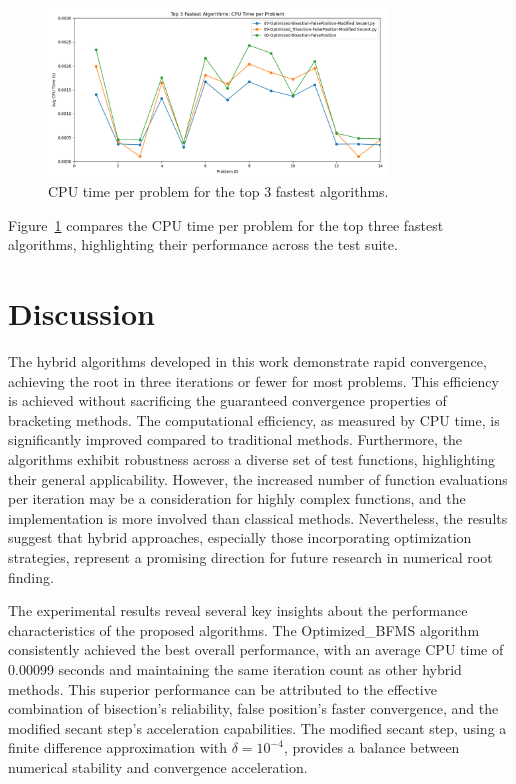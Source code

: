 \documentclass[amsmath, amssymb, aps]{revtex4-2}
\begin{document}
\begin{figure}[H]
    \centering
    \includegraphics[width=0.8\textwidth]{top3_fastest_algorithms_lineplot.png}
    \caption{CPU time per problem for the top 3 fastest algorithms.}
    \label{fig:top3_fastest_algorithms}
\end{figure}

Figure~\ref{fig:top3_fastest_algorithms} compares the CPU time per problem for the top three fastest algorithms, highlighting their performance across the test suite.

\section{Discussion}\label{sec:discussion}

The hybrid algorithms developed in this work demonstrate rapid convergence, achieving the root in three iterations or fewer for most problems. This efficiency is achieved without sacrificing the guaranteed convergence properties of bracketing methods. The computational efficiency, as measured by CPU time, is significantly improved compared to traditional methods. Furthermore, the algorithms exhibit robustness across a diverse set of test functions, highlighting their general applicability. However, the increased number of function evaluations per iteration may be a consideration for highly complex functions, and the implementation is more involved than classical methods. Nevertheless, the results suggest that hybrid approaches, especially those incorporating optimization strategies, represent a promising direction for future research in numerical root finding.

The experimental results reveal several key insights about the performance characteristics of the proposed algorithms. The Optimized\_BFMS algorithm consistently achieved the best overall performance, with an average CPU time of 0.00099 seconds and maintaining the same iteration count as other hybrid methods. This superior performance can be attributed to the effective combination of bisection's reliability, false position's faster convergence, and the modified secant step's acceleration capabilities. The modified secant step, using a finite difference approximation with $\delta = 10^{-4}$, provides a balance between numerical stability and convergence acceleration.
\end{document}
